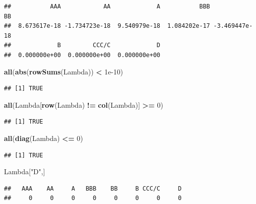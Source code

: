 \documentclass[
  11pt,
]{article}
\newenvironment{Shaded}{\begin{snugshade}}{\end{snugshade}}
\newcommand{\DecValTok}[1]{\textcolor[rgb]{0.00,0.00,0.81}{#1}}
\newcommand{\FloatTok}[1]{\textcolor[rgb]{0.00,0.00,0.81}{#1}}
\newcommand{\FunctionTok}[1]{\textcolor[rgb]{0.13,0.29,0.53}{\textbf{#1}}}
\newcommand{\NormalTok}[1]{#1}
\newcommand{\SpecialCharTok}[1]{\textcolor[rgb]{0.81,0.36,0.00}{\textbf{#1}}}
\newcommand{\StringTok}[1]{\textcolor[rgb]{0.31,0.60,0.02}{#1}}
\begin{document}
\begin{verbatim}
##           AAA            AA             A           BBB            BB 
##  8.673617e-18 -1.734723e-18  9.540979e-18  1.084202e-17 -3.469447e-18 
##             B         CCC/C             D 
##  0.000000e+00  0.000000e+00  0.000000e+00
\end{verbatim}

\begin{Shaded}
\begin{Highlighting}[]
\FunctionTok{all}\NormalTok{(}\FunctionTok{abs}\NormalTok{(}\FunctionTok{rowSums}\NormalTok{(Lambda)) }\SpecialCharTok{\textless{}} \FloatTok{1e{-}10}\NormalTok{)}
\end{Highlighting}
\end{Shaded}

\begin{verbatim}
## [1] TRUE
\end{verbatim}

\begin{Shaded}
\begin{Highlighting}[]
\FunctionTok{all}\NormalTok{(Lambda[}\FunctionTok{row}\NormalTok{(Lambda) }\SpecialCharTok{!=} \FunctionTok{col}\NormalTok{(Lambda)] }\SpecialCharTok{\textgreater{}=} \DecValTok{0}\NormalTok{)}
\end{Highlighting}
\end{Shaded}

\begin{verbatim}
## [1] TRUE
\end{verbatim}

\begin{Shaded}
\begin{Highlighting}[]
\FunctionTok{all}\NormalTok{(}\FunctionTok{diag}\NormalTok{(Lambda) }\SpecialCharTok{\textless{}=} \DecValTok{0}\NormalTok{)}
\end{Highlighting}
\end{Shaded}

\begin{verbatim}
## [1] TRUE
\end{verbatim}

\begin{Shaded}
\begin{Highlighting}[]
\NormalTok{Lambda[}\StringTok{"D"}\NormalTok{,]}
\end{Highlighting}
\end{Shaded}

\begin{verbatim}
##   AAA    AA     A   BBB    BB     B CCC/C     D 
##     0     0     0     0     0     0     0     0
\end{verbatim}
\end{document}
